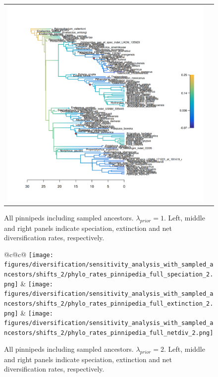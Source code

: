 \documentclass[a4paper, 12pt]{article}
\begin{document}
\begin{figure}[H]
\begin{tabular}{@{}c@{\hspace{.5cm}}c@{}}
  \includegraphics[width = \linewidth]{figures/diversification/main_analysis_with_sampled_ancestors/phylo_rates_pinnipedia_full_netdiv.png} \\
  \end{tabular}
  \caption{All pinnipeds including sampled ancestors. $\lambda_{prior} = 1$. Left, middle and right panels indicate speciation, extinction and net diversification rates, respectively.}
  \label{fig-full-1}
\end{figure}


\begin{figure}[H]
  \centering
  \begin{tabular}{@{}c@{\hspace{.5cm}}c@{}}
  \texttt{[image: figures/diversification/sensitivity\_analysis\_with\_sampled\_ancestors/shifts\_2/phylo\_rates\_pinnipedia\_full\_speciation\_2.png]} &
  \texttt{[image: figures/diversification/sensitivity\_analysis\_with\_sampled\_ancestors/shifts\_2/phylo\_rates\_pinnipedia\_full\_extinction\_2.png]} &
  \texttt{[image: figures/diversification/sensitivity\_analysis\_with\_sampled\_ancestors/shifts\_2/phylo\_rates\_pinnipedia\_full\_netdiv\_2.png]} \\
  \end{tabular}
  \caption{All pinnipeds including sampled ancestors. $\lambda_{prior} = 2$. Left, middle and right panels indicate speciation, extinction and net diversification rates, respectively.}
  \label{fig-full-2}
\end{figure}
\end{document}
